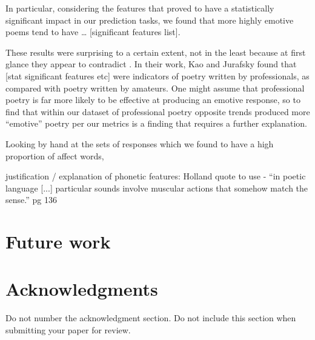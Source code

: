 \documentclass[11pt]{article}
\begin{document}
In particular, considering the features that proved to have a statistically significant impact in our prediction tasks, we found that more highly emotive poems tend to have … [significant features list].

These results were surprising to a certain extent, not in the least because at first glance they appear to contradict \cite{kaoandjurafsky2012}. In their work, Kao and Jurafsky found that [stat significant features etc] were indicators of poetry written by professionals, as compared with poetry written by amateurs. One might assume that professional poetry is far more likely to be effective at producing an emotive response, so to find that within our dataset of professional poetry opposite trends produced more ``emotive'' poetry per our metrics is a finding that requires a further explanation.

Looking by hand at the sets of responses which we found to have a high proportion of affect words, 


justification / explanation of phonetic features: 
   Holland quote to use -  “in poetic language [...] particular sounds involve muscular actions that somehow match the sense.” pg 136


\section{Future work}



\section*{Acknowledgments}

Do not number the acknowledgment section. Do not include this section when submitting your paper for review.




\end{document}
